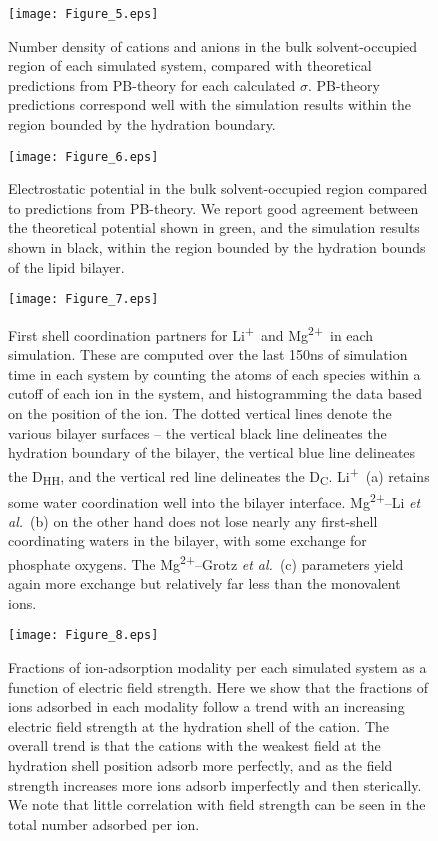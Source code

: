 \documentclass[journal=langd5,manuscript=article]{achemso}
\newcommand{\etal}{\textit{et al.}~}
\newcommand{\li}{Li\textsuperscript{+}~}
\newcommand{\mg}{Mg\textsuperscript{2+}~}
\newcommand{\mgmbnbfix}{Mg\textsuperscript{2+}--Li \etal} %
\newcommand{\mgmicro}{Mg\textsuperscript{2+}--Grotz \etal}
\begin{document}
\clearpage
\begin{figure}
    \caption{Number density of cations and anions in the bulk solvent-occupied region of each
    simulated system, compared with theoretical predictions from PB-theory for each calculated $\sigma$. PB-theory predictions
    correspond well with the simulation results within the region bounded by the hydration boundary.}
    \label{fig:catgcdens}
    \texttt{[image: Figure\_5.eps]}
\end{figure}
\clearpage
\begin{figure}
    \caption{Electrostatic potential in the bulk solvent-occupied region compared to predictions from PB-theory. We report good
    agreement between the theoretical potential shown in green, and the simulation results shown in black, within the region bounded by the hydration
    bounds of the lipid bilayer.}
    \label{fig:potgc}
    \texttt{[image: Figure\_6.eps]}
\end{figure}
\clearpage
\begin{figure}
    \caption{First shell coordination partners 
        for \li and \mg in each simulation. 
        These are computed over the last 150ns of 
        simulation time in each system by counting 
        the atoms of each species within a cutoff 
        of each ion in the system, and histogramming 
        the data based on the position of the ion. 
        The dotted vertical lines denote the various 
        bilayer surfaces -- the vertical black
        line delineates the hydration boundary of the bilayer,
        the vertical blue line delineates the D\textsubscript{HH},
        and the vertical red line delineates the D\textsubscript{C}.
        \li (a) retains some water 
        coordination well into the bilayer
        interface.
        \mgmbnbfix (b) on the other hand does not lose
        nearly any first-shell coordinating
        waters in the bilayer, with some exchange for phosphate
        oxygens. The \mgmicro (c) parameters yield again more exchange but 
        relatively far less than the monovalent
    ions.}
    \label{fig:cood}
    \texttt{[image: Figure\_7.eps]}
\end{figure}
\clearpage
\begin{figure}
    \caption{Fractions of ion-adsorption modality per each simulated system as a function of electric field strength. Here we 
    show that the fractions of ions adsorbed in each modality follow a trend with an increasing electric field strength at the
    hydration shell of the cation. The overall trend is that the cations with the weakest field at the hydration shell position
    adsorb more perfectly, and as the field strength increases more ions adsorb imperfectly and then sterically. We note
    that little correlation with field strength can be seen in the total number adsorbed per ion.}
    \label{fig:cationfrac}
    \texttt{[image: Figure\_8.eps]}
\end{figure}
\clearpage
\end{document}
